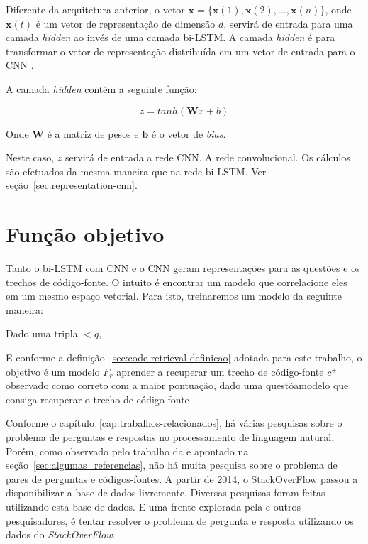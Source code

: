Diferente da arquitetura anterior, o vetor $\bm{x} = \{ \bm{x}(1), \bm{x}(2), . . ., \bm{x}(n) \}$, onde $\bm{x}(t)$ é um vetor de representação de dimensão $d$, servirá de entrada para uma camada \textit{hidden} ao invés de uma camada bi-LSTM. A camada \textit{hidden} é para transformar o vetor de representação distribuída em um vetor de entrada para o CNN \citep{tan-lstm-qa}.

A camada \textit{hidden} contém a seguinte função:

\begin{equation}
z = tanh(\bm{W}x + b)
\end{equation}

Onde $\bm{W}$ é a matriz de pesos e $\bm{b}$ é o vetor de \textit{bias}.

Neste caso, $z$ servirá de entrada a rede CNN. A rede convolucional. Os cálculos são efetuados da mesma maneira que na rede bi-LSTM. Ver seção~\ref{sec:representation-cnn}.

\section{Função objetivo}

Tanto o bi-LSTM com CNN e o CNN geram representações para as questões e os trechos de código-fonte. O intuito é encontrar um modelo que correlacione eles em um mesmo espaço vetorial.
Para isto, treinaremos um modelo da seguinte maneira:

Dado uma tripla $<q, $

E conforme a definição~\ref{sec:code-retrieval-definicao} adotada para este trabalho, o objetivo é um modelo $F_{r}$ aprender a recuperar um trecho de código-fonte $c^{+}$ observado como correto com a maior pontuação, dado uma questõamodelo que consiga recuperar o trecho de código-fonte 


Conforme o capítulo~\ref{cap:trabalhos-relacionados}, há várias pesquisas sobre o problema de perguntas e respostas no processamento de linguagem natural. Porém, como observado pelo trabalho da \cite{yao-2018} e apontado na seção~\ref{sec:algumas_referencias}, não há muita pesquisa sobre o problema de pares de perguntas e códigos-fontes. A partir de 2014, o StackOverFlow passou a disponibilizar a base de dados livremente. Diversas pesquisas foram feitas utilizando esta base de dados. E uma frente explorada pela \cite{yao-2018} e outros pesquisadores, é tentar resolver o problema de pergunta e resposta utilizando os dados do \textit{StackOverFlow}.

